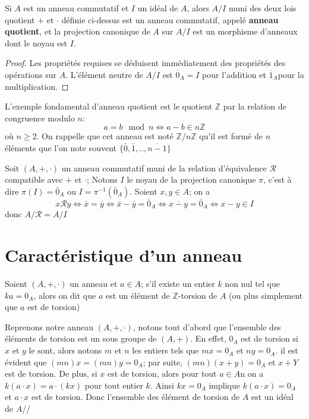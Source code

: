     \begin{proposition}
        Si $A$ est un anneau commutatif et $I$ un idéal de $A$, alors $A/I$ muni des deux lois quotient $+$ et $\cdot$ définie ci-dessus est un anneau commutatif, appelé \textbf{anneau quotient}, et la projection canonique de $A$ sur $A/I$ est un morphisme d'anneaux dont le noyau est $I$.
    \end{proposition}
\begin{proof}
    Les propriétés requises se déduisent immédiatement des propriétés des opérations sur $A$. L'élément neutre de $A/I$ est $\overline{0}_A=I$ pour l'addition et $\overline{1}_A $pour la multiplication.
\end{proof}
\begin{exemple}
    L'exemple fondamental d'anneau quotient est le quotient $\mathbb{Z}$ par la relation de congruence modulo $n$:
    \[
    a=b \mod n \Leftrightarrow a-b\in n\mathbb{Z}
    \]
    où $n \geq 2.$ On rappelle que cet anneau est noté $\mathbb{Z}/n\mathbb{Z}$ qu'il est formé de $n$ éléments que l'on note souvent $\{\bar{0},\bar{1},..,\overline{n-1}\}$
\end{exemple}
\begin{mdframed}
\begin{remarque}
    Soit $(A,+,\cdot)$ un anneau commutatif muni de la relation d'équivalence $\mathcal{R}$ compatible avec $+$ et $\cdot$; Notons $I$ le noyau de la projection canonique $\pi$, c'est à dire $\pi (I)=\bar{0}_A$ ou $I=\pi^{-1}(\bar{0}_A)$. Soient $x,y\in A$; on a
    \[
    x\mathcal{R}y \Leftrightarrow \bar{x}=\bar{y}\Leftrightarrow \bar{x}-\bar{y}=\bar{0}_A\Leftrightarrow\overline{x-y}=\bar{0}_A
\Leftrightarrow x-y \in I    \]
donc $A/\mathcal{R}= A/I$
\end{remarque}
\end{mdframed}
\section{Caractéristique d'un anneau}
\begin{definition}
Soient $(A,+,\cdot)$ un anneau et $a\in A$; s'il existe un entier $k$ non nul tel que $ka=0_A$, alors on dit que $a$ est un élément de $\mathbb{Z}\text{-torsion}$ de $A$ (ou plus simplement que $a$ est de torsion)
\end{definition}
\begin{mdframed}
Reprenons notre anneau $(A,+,\cdot)$, notons tout d'abord que l'ensemble des éléments de torsion est un sous groupe de $(A,+)$. En effet, $0_A$ est de torsion si $x$ et $y$ le sont, alors notons $m$ et $n$ les entiers tels que $mx=0_A$ et $ny=0_A$. il est évident que $(mn)x=(mn)y=0_A$; par suite, $(mn)(x+y)=0_A$ et $x+Y$ est de torsion. De plus, si $x$ est de torsion, alors pour tout $a\in A$n on a $k(a\cdot x)=a\cdot(kx)$ pour tout entier $k$. Ainsi $kx=0_A$ implique $k(a\cdot x)=0_A$ et $a\cdot x$ est de torsion.
Donc l'ensemble des élément de torsion de $A$ est un idéal de $A$//
\end{mdframed}

